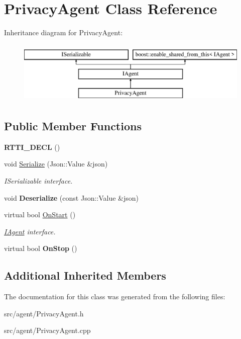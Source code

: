 \hypertarget{class_privacy_agent}{}\section{Privacy\+Agent Class Reference}
\label{class_privacy_agent}
Inheritance diagram for Privacy\+Agent\+:\begin{figure}[H]
\begin{center}
\leavevmode
\includegraphics[height=3.000000cm]{class_privacy_agent}
\end{center}
\end{figure}
\subsection*{Public Member Functions}
\begin{DoxyCompactItemize}
\item 
\mbox{\label{class_privacy_agent_a5daaaddc4af6cf5250952157bca82ccd}} 
{\bfseries R\+T\+T\+I\+\_\+\+D\+E\+CL} ()
\item 
\mbox{\label{class_privacy_agent_a6bc23ed8588897e44724e45267cf1082}} 
void \hyperlink{class_privacy_agent_a6bc23ed8588897e44724e45267cf1082}{Serialize} (Json\+::\+Value \&json)
\begin{DoxyCompactList}\small\item\em I\+Serializable interface. \end{DoxyCompactList}\item 
\mbox{\label{class_privacy_agent_ab865673038e6ec7125c2c9121d6408f8}} 
void {\bfseries Deserialize} (const Json\+::\+Value \&json)
\item 
\mbox{\label{class_privacy_agent_a67a8c2558a527c1a1f05b311bc63355d}} 
virtual bool \hyperlink{class_privacy_agent_a67a8c2558a527c1a1f05b311bc63355d}{On\+Start} ()
\begin{DoxyCompactList}\small\item\em \hyperlink{class_i_agent}{I\+Agent} interface. \end{DoxyCompactList}\item 
\mbox{\label{class_privacy_agent_a77ccce200ed791007c6585ac0197866d}} 
virtual bool {\bfseries On\+Stop} ()
\end{DoxyCompactItemize}
\subsection*{Additional Inherited Members}


The documentation for this class was generated from the following files\+:\begin{DoxyCompactItemize}
\item 
src/agent/Privacy\+Agent.\+h\item 
src/agent/Privacy\+Agent.\+cpp\end{DoxyCompactItemize}
